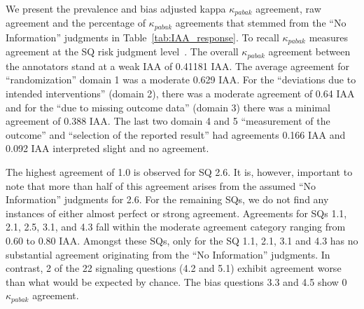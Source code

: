 \documentclass[sn-mathphys,Numbered]{sn-jnl}%
\theoremstyle{thmstyleone}%
\theoremstyle{thmstyletwo}%
\theoremstyle{thmstylethree}%
\begin{document}
We present the prevalence and bias adjusted kappa $\kappa_{pabak}$ agreement, raw agreement and the percentage of $\kappa_{pabak}$ agreements
that stemmed from the ``No Information'' judgments in Table~\ref{tab:IAA_response}.
To recall $\kappa_{pabak}$ measures agreement at the SQ risk judgment level~\cite{mchugh2012interrater}.
The overall $\kappa_{pabak}$ agreement between the annotators stand at a weak IAA of 0.41181 IAA.
The average agreement for ``randomization'' domain 1 was a moderate 0.629 IAA.
For the ``deviations due to intended interventions'' (domain 2), there was a moderate agreement of 0.64 IAA and for the ``due to missing outcome data'' (domain 3) there was a minimal agreement of 0.388 IAA.
The last two domain 4 and 5 ``measurement of the outcome'' and ``selection of the reported result'' had agreements 0.166 IAA and 0.092 IAA interpreted slight and no agreement.



The highest agreement of 1.0 is observed for SQ 2.6.
It is, however, important to note that more than half of this agreement arises from the assumed ``No Information'' judgments for 2.6.
For the remaining SQs, we do not find any instances of either almost perfect or strong agreement.
Agreements for SQs 1.1, 2.1, 2.5, 3.1, and 4.3 fall within the moderate agreement category ranging from 0.60 to 0.80 IAA.
Amongst these SQs, only for the SQ 1.1, 2.1, 3.1 and 4.3 has no substantial agreement originating from the ``No Information'' judgments.
In contrast, 2 of the 22 signaling questions (4.2 and 5.1) exhibit agreement worse than what would be expected by chance.
The bias questions 3.3 and 4.5 show 0 $\kappa_{pabak}$ agreement.
\end{document}
